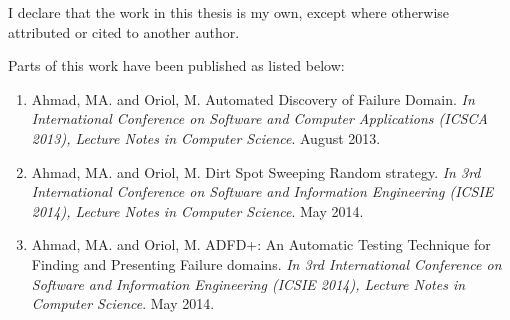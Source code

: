 \begin{declaration}

I declare that the work in this thesis is my own, except where otherwise attributed or cited to another author. 

Parts of this work have been published as listed below: 

\begin{enumerate}
\item Ahmad, MA. and Oriol, M. Automated Discovery of Failure Domain. \textit{In International Conference on Software and Computer Applications (ICSCA 2013), Lecture Notes in Computer Science}. August 2013.

\item Ahmad, MA. and Oriol, M. Dirt Spot Sweeping Random strategy. \textit{In 3rd International Conference on Software and Information Engineering (ICSIE 2014), Lecture Notes in Computer Science}. May 2014.

\item Ahmad, MA. and Oriol, M. ADFD+: An Automatic Testing Technique for Finding and Presenting Failure domains. \textit{In 3rd International Conference on Software and Information Engineering (ICSIE 2014), Lecture Notes in Computer Science}. May 2014.

\end{enumerate}



\end{declaration}